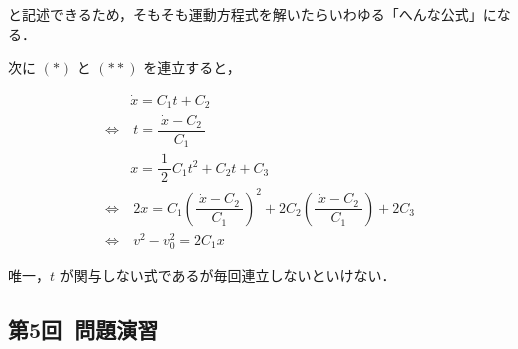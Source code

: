 \documentclass[a4paper,11pt]{ltjsarticle}
\begin{document}
と記述できるため，そもそも運動方程式を解いたらいわゆる「へんな公式」になる．

\noindent
次に $(\ast)$ と $(\ast \ast)$ を連立すると，

\begin{equation*}
  \begin{aligned}
    & \dot{x} = C_{1}t + C_{2} \\
    \Leftrightarrow&\ t = \dfrac{\ \dot{x}-C_{2}\ }{C_{1}} \\
    & x = \dfrac{1}{\ 2\ }C_{1}t^{2} + C_{2}t + C_{3} \\
    \Leftrightarrow &\ 2x = C_{1}\left(\dfrac{\ \dot{x}-C_{2}\ }{C_{1}}\right)^{2} + 2C_{2}\left(\dfrac{\ \dot{x}-C_{2}\ }{C_{1}}\right) + 2C_{3} \\
    \Leftrightarrow &\ v^{2} - v_{0}^{2} = 2C_{1}x
  \end{aligned}
\end{equation*}

唯一，$t$ が関与しない式であるが毎回連立しないといけない．

\subsection{第5回\ 問題演習}
\end{document}
